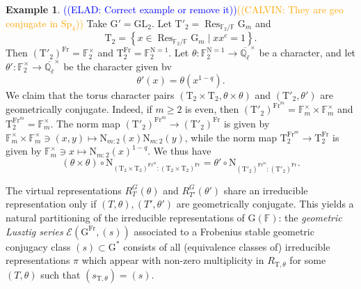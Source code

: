 \documentclass[12pt, reqno]{amsart}
\theoremstyle{definition}
\theoremstyle{definition}
\theoremstyle{definition}
\newtheorem{example}[theorem]{Example}
\newcommand{\multiplicativegroup}[1]{#1^{\times}}
\newcommand{\involution}[1]{#1^{c}}
\newcommand{\GL}{\mathrm{GL}}
\newcommand{\FieldNorm}[2]{\mathrm{N}_{#1:#2}}
\newcommand{\aFieldNorm}{\mathrm{N}}
\newcommand{\finiteField}{\mathbb{F}}
\newcommand{\finiteFieldExtension}[1]{\finiteField_{#1}}
\newcommand{\NormOneGroup}[1]{\finiteFieldExtension{#1}^{\aFieldNorm = 1}}
\newcommand{\algebraicClosure}[1]{\overline{#1}}
\newcommand{\Frobenius}{\operatorname{Fr}}
\newcommand{\restrictionOfScalars}[3]{\operatorname{Res}_{#1 \slash #2}{#3}}
\newcommand{\multiplcativeScheme}{\algebraicGroup{G}_m}
\newcommand{\ladicnumbers}{\algebraicClosure{\mathbb{Q}_{\ell}}}
\newcommand{\algebraicGroup}[1]{\boldsymbol{\mathrm{#1}}}
\newcommand{\LusztigSeries}[2]{\mathcal{E}\left(#1, (#2)\right)}
\newcommand{\calvin}[1]{\textcolor{orange}{\sffamily ((CALVIN: #1))}}
\newcommand{\elad}[1]{\textcolor{blue}{\sffamily ((ELAD: #1))}}
\begin{document}
\begin{example}
	\elad{Correct example or remove it}\calvin{They are geo conjugate in $\algebraicGroup{Sp}_4$}
	Take $\algebraicGroup{G}' = \algebraicGroup{\GL}_2$. Let $\algebraicGroup{T}'_2 = \restrictionOfScalars{\finiteFieldExtension{2}}{\finiteField}{\multiplcativeScheme}$ and $$\algebraicGroup{T}_2 = \left\{x \in \restrictionOfScalars{\finiteFieldExtension{2}}{\finiteField}{\multiplcativeScheme} \mid x \involution{x} = 1 \right\}.$$
	Then $\left(\algebraicGroup{T}'_2\right)^{\Frobenius} = \multiplicativegroup{\finiteFieldExtension{2}}$ and $\algebraicGroup{T}_2^{\Frobenius} = \NormOneGroup{2}$. Let $\theta \colon \NormOneGroup{2} \to \multiplicativegroup{\ladicnumbers}$ be a character, and let $\theta' \colon \multiplicativegroup{\finiteFieldExtension{2}} \to \multiplicativegroup{\ladicnumbers}$ be the character given bv $$\theta'\left(x\right) = \theta\left(x^{1-q}\right).$$
	We claim that the torus character pairs $\left(\algebraicGroup{T}_2 \times \algebraicGroup{T}_2, \theta \times \theta\right)$ and $\left(\algebraicGroup{T}'_2, \theta'\right)$ are geometrically conjugate. Indeed, if $m \ge 2$ is even, then $\left(\algebraicGroup{T}'_2\right)^{\Frobenius^{m}} = \multiplicativegroup{\finiteFieldExtension{m}} \times \multiplicativegroup{\finiteFieldExtension{m}}$ and $\algebraicGroup{T}_2^{\Frobenius^m} = \multiplicativegroup{\finiteFieldExtension{m}}$. The norm map $\left(\algebraicGroup{T}'_2\right)^{\Frobenius^{m}} \to \left(\algebraicGroup{T}'_2\right)^{\Frobenius}$ is given by $\multiplicativegroup{\finiteFieldExtension{m}} \times \multiplicativegroup{\finiteFieldExtension{m}} \ni \left(x,y\right) \mapsto \FieldNorm{m}{2}\left(x\right) \FieldNorm{m}{2}\left(y\right)$, while the norm map $\algebraicGroup{T}_2^{\Frobenius^{m}} \to \algebraicGroup{T}_2^{\Frobenius}$ is given by $\multiplicativegroup{\finiteFieldExtension{m}} \ni x \mapsto \FieldNorm{m}{2}\left(x\right)^{1-q}$. We thus have
	$$\left(\theta \times \theta\right) \circ \aFieldNorm_{ \left(\algebraicGroup{T}_2 \times \algebraicGroup{T}_2\right)^{\Frobenius^m} : \left(\algebraicGroup{T}_2 \times \algebraicGroup{T}_2\right)^{\Frobenius} } = \theta' \circ \aFieldNorm_{\left(\algebraicGroup{T}'_2\right)^{\Frobenius^m} \colon \left(\algebraicGroup{T}'_2\right)^{\Frobenius}}.$$
\end{example}

The virtual representations $R_T^G(\theta)$ and $R_{T'}^G(\theta')$ share an irreducible representation only if $(T,\theta),(T',\theta')$ are geometrically conjugate. This yields a natural partitioning of the irreducible representations of $\algebraicGroup{G}(\finiteField)$: the \emph{geometric Lusztig series} $\LusztigSeries{\algebraicGroup{G}^{\Frobenius}}{s}$ associated to a Frobenius stable geometric conjugacy class $(s) \subset \algebraicGroup{G}^*$ consists of all (equivalence classes of) irreducible representations $\pi$ which appear with non-zero multiplicity in $R_{\algebraicGroup{T}, \theta}$ for some $(T,\theta)$ such that $(s_{\algebraicGroup{T},\theta}) = (s)$.
\end{document}
